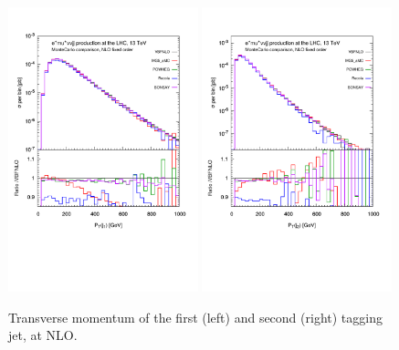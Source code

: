 \documentclass[a4paper,10pt]{report}
\begin{document}
\begin{figure}[h!]
   \centering
   \includegraphics[width=0.49\textwidth,angle=0,clip=true,trim={0.4cm 2.5cm 0.6cm 1.cm}]{figures/ptj1_NLO.pdf}
   \includegraphics[width=0.49\textwidth,angle=0,clip=true,trim={0.4cm 2.5cm 0.6cm 1.cm}]{figures/ptj2_NLO.pdf}
\caption{\label{fig:ptj1-2NLO}Transverse momentum of the first (left) and second (right) tagging jet, at NLO.
}
\end{figure}
%
\end{document}
